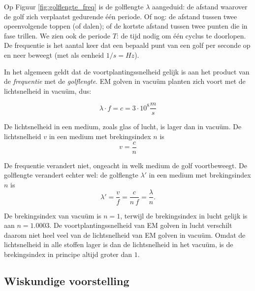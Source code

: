  Op Figuur \ref{fig:golflengte_freq} is de golflengte $\lambda$ aangeduid: de afstand waarover de golf zich verplaatst gedurende \'e\'en periode. Of nog: de afstand tussen twee opeenvolgende toppen (of dalen); of de kortste afstand tussen twee punten die in fase trillen.
 We zien ook de periode $T$: de tijd nodig om \'e\'en cyclus te doorlopen. De frequentie is het aantal keer dat een bepaald punt van een golf per seconde op en neer beweegt (met als eenheid $1/s=Hz$).

 In het algemeen geldt dat de voortplantingssnelheid gelijk is aan het product van de \emph{frequentie} met de \emph{golflengte}. EM golven in vacu\"um planten zich voort met de lichtsnelheid in vacu\"um, dus: 

 \begin{equation*}
     \lambda \cdot f = c = 3 \cdot 10^8 \frac{m}{s}
 \end{equation*}

 De lichtsnelheid in een medium, zoals glas of lucht, is lager dan in vacu\"um. De lichtsnelheid $v$ in een medium met brekingsindex $n$ is
 \begin{equation*}
     v = \frac{c}{n}
 \end{equation*}

 De frequentie verandert niet, ongeacht in welk medium de golf voortbeweegt. De golflengte verandert echter wel: de golflengte $\lambda'$ in een medium met brekingsindex $n$ is
 \begin{equation*}
     \lambda' = \frac{v}{f} = \frac{c}{n~f}=\frac{\lambda}{n}.
 \end{equation*}

 De brekingsindex van vacu\"um is $n=1$, terwijl de brekingsindex in lucht gelijk is aan $n=1.0003$.  De voortplantingssnelheid van EM golven in lucht verschilt daarom niet heel veel van de lichtsnelheid van EM golven in vacu\"um. Omdat de lichtsnelheid in alle stoffen lager is dan de lichtsnelheid in het vacu\"um, is de brekingsindex in principe altijd groter dan $1$.


 \subsection{Wiskundige voorstelling}

